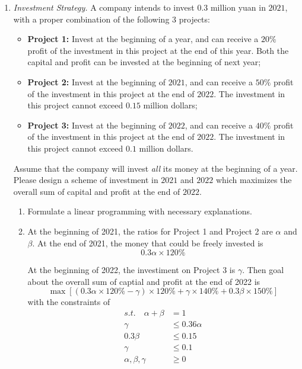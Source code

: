 \documentclass[12pt,a4paper]{article}
\makeatletter
\newtheorem*{solution}{Solution}
\theoremstyle{definition}
\renewenvironment{solution}[1][Solution] {\par\pushQED{\qed}\normalfont\topsep6\p@\@plus6\p@\relax\trivlist\item[\hskip\labelsep\bfseries#1\@addpunct{.}]\ignorespaces}{\popQED\endtrivlist\@endpefalse} \makeatother
\makeatother
\begin{document}
\begin{enumerate}
    \item
    \textit{Investment Strategy.} A company intends to invest $0.3$ million yuan in $2021$, with a proper combination of the following $3$ projects:
    \begin{itemize}
    \item \textbf{Project 1:} Invest at the beginning of a year, and can receive a $20\%$ profit of the investment in this project at the end of this year. Both the capital and profit can be invested at the beginning of next year;
    \item \textbf{Project 2:} Invest at the beginning of $2021$, and can receive a $50\%$ profit of the investment in this project at the end of $2022$. The investment in this project cannot exceed $0.15$ million dollars;
    \item \textbf{Project 3:} Invest at the beginning of $2022$, and can receive a $40\%$ profit of the investment in this project at the end of $2022$. The investment in this project cannot exceed $0.1$ million dollars.
    \end{itemize}
    Assume that the company will invest \emph{all} its money at the beginning of a year. Please design a scheme of investment in $2021$ and $2022$ which maximizes the overall sum of capital and profit at the end of $2022$.
    \begin{enumerate}
    \item
    Formulate a linear programming with necessary explanations.
    \begin{solution}
      At the beginning of 2021, the ratios for Project 1 and Project 2 are $\alpha$ and $\beta$. At the end of 2021, the money that could be freely invested is 
      \begin{equation*}
        0.3\alpha\times 120\%
      \end{equation*}

      At the beginning of 2022, the investiment on Project 3 is $\gamma$. Then goal about the overall sum of captial and profit at the end of 2022 is
      \begin{equation*}
        \max \left[(0.3\alpha\times 120\% - \gamma) \times 120\% +\gamma \times 140\% + 0.3\beta\times 150\%\right]
      \end{equation*}
      with the constraints of
      \begin{align*}
      s.t.\quad\alpha + \beta &= 1\\
        \gamma &\leq 0.36\alpha\\
        0.3\beta &\leq 0.15\\
        \gamma  &\leq 0.1\\
        \alpha,\beta,\gamma&\geq 0
      \end{align*}


\end{solution}
\end{enumerate}
\end{enumerate}
\end{document}
